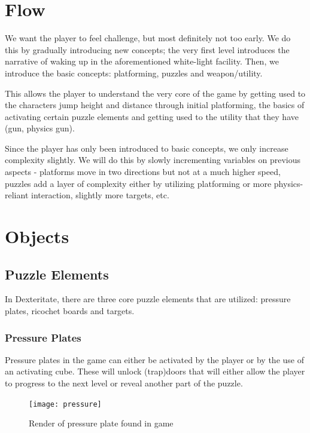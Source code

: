\documentclass[11pt]{article}
\begin{document}
\section*{Flow}
We want the player to feel challenge, but most definitely not too early. We do this by gradually introducing new concepts; the very first level introduces the narrative of waking up in the aforementioned white-light facility. Then, we introduce the basic concepts: platforming, puzzles and weapon/utility. 

This allows the player to understand the very core of the game by getting used to the characters jump height and distance through initial platforming, the basics of activating certain puzzle elements and getting used to the utility that they have (gun, physics gun).

Since the player has only been introduced to basic concepts, we only increase complexity slightly. We will do this by slowly incrementing variables on previous aspects - platforms move in two directions but not at a much higher speed, puzzles add a layer of complexity either by utilizing platforming or more physics-reliant interaction, slightly more targets, etc.


\newpage
\section*{Objects}
\subsection*{Puzzle Elements}

In Dexteritate, there are three core puzzle elements that are utilized: pressure plates, ricochet boards and targets.

\subsubsection*{Pressure Plates}
Pressure plates in the game can either be activated by the player or by the use of an activating cube. These will unlock (trap)doors that will either allow the player to progress to the next level or reveal another part of the puzzle.  \\

\begin{figure}[h]
\begin{center}
\texttt{[image: pressure]}
\end{center}
\caption{Render of pressure plate found in game}
\end{figure}
\end{document}

